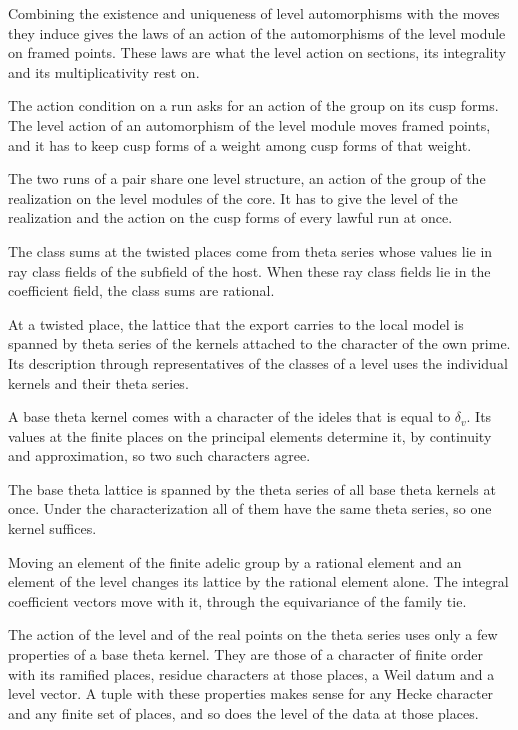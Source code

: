 Combining the existence and uniqueness of level automorphisms with the moves they induce gives the laws
of an action of the automorphisms of the level module on framed points. These laws are what the level
action on sections, its integrality and its multiplicativity rest on.

The action condition on a run asks for an action of the group on its cusp forms. The level action of an
automorphism of the level module moves framed points, and it has to keep cusp forms of a weight among
cusp forms of that weight.

The two runs of a pair share one level structure, an action of the group of the realization on the
level modules of the core. It has to give the level of the realization and the action on the cusp
forms of every lawful run at once.

The class sums at the twisted places come from theta series whose values lie in ray class fields of
the subfield of the host. When these ray class fields lie in the coefficient field, the class sums
are rational.

At a twisted place, the lattice that the export carries to the local model is spanned by theta
series of the kernels attached to the character of the own prime. Its description through
representatives of the classes of a level uses the individual kernels and their theta series.

A base theta kernel comes with a character of the ideles that is equal to $\delta_v$. Its values at the
finite places on the principal elements determine it, by continuity and approximation, so two such
characters agree.

The base theta lattice is spanned by the theta series of all base theta kernels at once. Under the
characterization all of them have the same theta series, so one kernel suffices.

Moving an element of the finite adelic group by a rational element and an element of the level changes
its lattice by the rational element alone. The integral coefficient vectors move with it, through the
equivariance of the family tie.

The action of the level and of the real points on the theta series uses only a few properties of a base
theta kernel. They are those of a character of finite order with its ramified places, residue characters
at those places, a Weil datum and a level vector. A tuple with these properties makes sense for any Hecke
character and any finite set of places, and so does the level of the data at those places.

